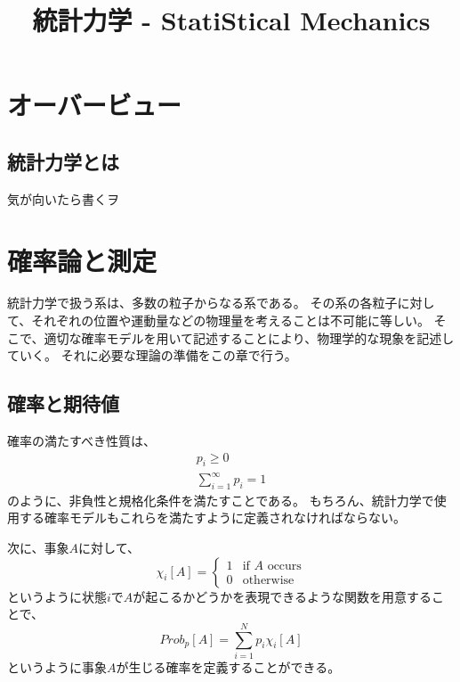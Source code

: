 \documentclass[a4paper]{jsreport}
\title{統計力学 - StatiStical Mechanics}
\begin{document}
    \maketitle

    \tableofcontents

    \chapter{オーバービュー}

        \section{統計力学とは}
            気が向いたら書くヲ

    \chapter{確率論と測定}
            
            統計力学で扱う系は、多数の粒子からなる系である。
            その系の各粒子に対して、それぞれの位置や運動量などの物理量を考えることは不可能に等しい。
            そこで、適切な確率モデルを用いて記述することにより、物理学的な現象を記述していく。
            それに必要な理論の準備をこの章で行う。

        \section{確率と期待値}
            確率の満たすべき性質は、
            \begin{align}
                p_i \ge 0 \\
                \sum_{i=1}^{\infty} p_i = 1
            \end{align}
            のように、非負性と規格化条件を満たすことである。
            もちろん、統計力学で使用する確率モデルもこれらを満たすように定義されなければならない。\par
            次に、事象$A$に対して、
            \begin{equation}
                \chi_i[A] = \begin{cases}
                    1 & \text{if $A$ occurs} \\
                    0 & \text{otherwise}
                \end{cases}
            \end{equation}
            というように状態$i$で$A$が起こるかどうかを表現できるような関数を用意することで、
            \begin{equation}
                Prob_p[A] = \sum_{i=1}^{N} p_i \chi_i[A]
            \end{equation}
            というように事象$A$が生じる確率を定義することができる。
            
\end{document}
